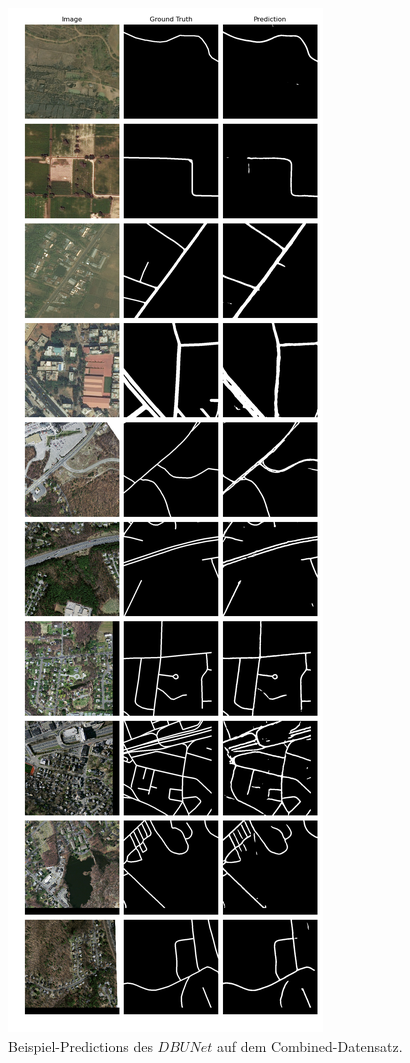 \begin{figure}
	\centering
	\includegraphics[width=.41\textwidth]{Bilder/Samples-Combined/dbunet.png}
	\caption{Beispiel-Predictions des $DBUNet$ auf dem Combined-Datensatz.}
	\label{fig:combined-samples-dbunet}
\end{figure}

